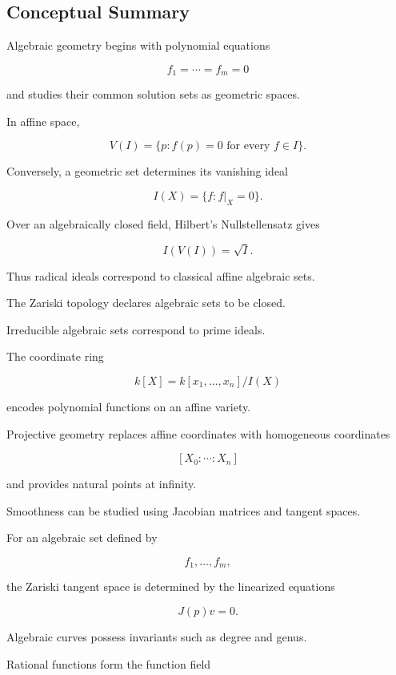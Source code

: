 \subsection{Conceptual Summary}
\label{subsec:algebraic-geometry-summary}

Algebraic geometry begins with polynomial equations

\[
f_1=\cdots=f_m=0
\]

and studies their common solution sets as geometric spaces.

In affine space,

\[
\boxed{
V(I)
=
\{
p:
f(p)=0
\text{ for every }f\in I
\}.
}
\]

Conversely, a geometric set determines its vanishing ideal

\[
\boxed{
I(X)
=
\{
f:
f|_X=0
\}.
}
\]

Over an algebraically closed field, Hilbert's Nullstellensatz gives

\[
\boxed{
I(V(I))=\sqrt{I}.
}
\]

Thus radical ideals correspond to classical affine algebraic sets.

The Zariski topology declares algebraic sets to be closed.

Irreducible algebraic sets correspond to prime ideals.

The coordinate ring

\[
\boxed{
k[X]
=
k[x_1,\ldots,x_n]/I(X)
}
\]

encodes polynomial functions on an affine variety.

Projective geometry replaces affine coordinates with homogeneous coordinates

\[
[X_0:\cdots:X_n]
\]

and provides natural points at infinity.

Smoothness can be studied using Jacobian matrices and tangent spaces.

For an algebraic set defined by

\[
f_1,\ldots,f_m,
\]

the Zariski tangent space is determined by the linearized equations

\[
\boxed{
J(p)v=0.
}
\]

Algebraic curves possess invariants such as degree and genus.

Rational functions form the function field

